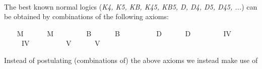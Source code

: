 \begin{isabellebody}
\ \isamarkupfalse%
\ {\isachardoublequoteopen}{\isasymlfloor}{\isasymphi}\ \isactrlbold {\isasymrightarrow}\ \isactrlbold {\isasymbox}{\isasymphi}{\isasymrfloor}{\isachardoublequoteclose}\ \isamarkupfalse%
%
\ %
%
\isamarkupfalse%
\ \ \ \ \ \ \ \ \ \ \ \ \ \ \ \ \ \ %
%
%
%
%
\isamarkuptrue%
%
\begin{isamarkuptext}%
The best known normal logics (\emph{K4, K5, KB, K45, KB5, D, D4, D5, D45, ...}) can be obtained by
 combinations of the following axioms:%
\end{isamarkuptext}\isamarkuptrue%
\ \ \isamarkupfalse%
\ M\ \isanewline
\ \ \ \ \ {\isachardoublequoteopen}M\ {\isasymequiv}\ \isactrlbold {\isasymforall}{\isasymphi}{\isachardot}\ \isactrlbold {\isasymbox}{\isasymphi}\ \isactrlbold {\isasymrightarrow}\ {\isasymphi}{\isachardoublequoteclose}\isanewline
\ \ \isamarkupfalse%
\ B\ \isanewline
\ \ \ \ \ {\isachardoublequoteopen}B\ {\isasymequiv}\ \isactrlbold {\isasymforall}{\isasymphi}{\isachardot}\ {\isasymphi}\ \isactrlbold {\isasymrightarrow}\ \ \isactrlbold {\isasymbox}\isactrlbold {\isasymdiamond}{\isasymphi}{\isachardoublequoteclose}\isanewline
\ \ \isamarkupfalse%
\ D\ \isanewline
\ \ \ \ \ {\isachardoublequoteopen}D\ {\isasymequiv}\ \isactrlbold {\isasymforall}{\isasymphi}{\isachardot}\ \isactrlbold {\isasymbox}{\isasymphi}\ \isactrlbold {\isasymrightarrow}\ \isactrlbold {\isasymdiamond}{\isasymphi}{\isachardoublequoteclose}\isanewline
\ \ \isamarkupfalse%
\ IV\ \isanewline
\ \ \ \ \ {\isachardoublequoteopen}IV\ {\isasymequiv}\ \isactrlbold {\isasymforall}{\isasymphi}{\isachardot}\ \isactrlbold {\isasymbox}{\isasymphi}\ \isactrlbold {\isasymrightarrow}\ \ \isactrlbold {\isasymbox}\isactrlbold {\isasymbox}{\isasymphi}{\isachardoublequoteclose}\isanewline
\ \ \isamarkupfalse%
\ V\ \isanewline
\ \ \ \ \ {\isachardoublequoteopen}V\ {\isasymequiv}\ \isactrlbold {\isasymforall}{\isasymphi}{\isachardot}\ \isactrlbold {\isasymdiamond}{\isasymphi}\ \isactrlbold {\isasymrightarrow}\ \isactrlbold {\isasymbox}\isactrlbold {\isasymdiamond}{\isasymphi}{\isachardoublequoteclose}%
\begin{isamarkuptext}%
Instead of postulating (combinations of) the above  axioms we instead make use of 

\end{isamarkuptext}
\end{isabellebody}
